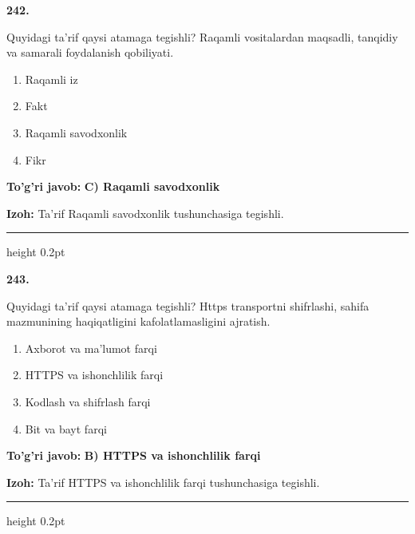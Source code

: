 \documentclass[10pt,a4paper,oneside]{article}
\begin{document}
\noindent\textbf{\color{ink}242.}
\par
Quyidagi ta'rif qaysi atamaga tegishli? Raqamli vositalardan maqsadli, tanqidiy va samarali foydalanish qobiliyati.
\begin{enumerate}[label=\Alph*),leftmargin=9mm]
\item Raqamli iz
\item Fakt
\item Raqamli savodxonlik
\item Fikr
\end{enumerate}
\begin{tcolorbox}[enhanced,breakable,colback=teal!4,colframe=teal!50!black,boxrule=0.5pt,arc=1.1mm,left=3mm,right=3mm,top=1.7mm,bottom=1.7mm,before skip=2mm,after skip=2mm]
\textbf{\color{teal}To'g'ri javob:} \textbf{C) Raqamli savodxonlik}
\par\smallskip
\textbf{Izoh:} Ta'rif Raqamli savodxonlik tushunchasiga tegishli.
\end{tcolorbox}
\vspace{2mm}\hrule height 0.2pt \vspace{3mm}

\noindent\textbf{\color{ink}243.}
\par
Quyidagi ta'rif qaysi atamaga tegishli? Https transportni shifrlashi, sahifa mazmunining haqiqatligini kafolatlamasligini ajratish.
\begin{enumerate}[label=\Alph*),leftmargin=9mm]
\item Axborot va ma'lumot farqi
\item HTTPS va ishonchlilik farqi
\item Kodlash va shifrlash farqi
\item Bit va bayt farqi
\end{enumerate}
\begin{tcolorbox}[enhanced,breakable,colback=teal!4,colframe=teal!50!black,boxrule=0.5pt,arc=1.1mm,left=3mm,right=3mm,top=1.7mm,bottom=1.7mm,before skip=2mm,after skip=2mm]
\textbf{\color{teal}To'g'ri javob:} \textbf{B) HTTPS va ishonchlilik farqi}
\par\smallskip
\textbf{Izoh:} Ta'rif HTTPS va ishonchlilik farqi tushunchasiga tegishli.
\end{tcolorbox}
\vspace{2mm}\hrule height 0.2pt \vspace{3mm}
\end{document}
